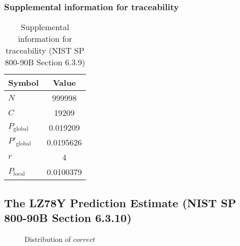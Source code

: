 \documentclass[a3paper,xelatex,english]{bxjsarticle}
\begin{document}
\subsubsection{Supplemental information for traceability}
\renewcommand{\arraystretch}{1.8}
\begin{table}[h]
\caption{Supplemental information for traceability (NIST SP 800-90B Section 6.3.9)}
\begin{center}
\begin{tabular}{|l|c|}
\hline 
\rowcolor{anotherlightblue} %
Symbol				& Value \\ \hline 
$N$				& 999998\\ \hline 
$C$				& 19209\\ \hline 
$P_{\textrm{global}}$				& 0.019209\\ \hline 
$P'_{\textrm{global}}$			& 0.0195626\\ \hline 
$r$				& 4\\ \hline 
$P_{\textrm{local}}$ 			& 0.0100379\\ \hline
\end{tabular}
\end{center}
\end{table}
\renewcommand{\arraystretch}{1.4}
\clearpage
\subsection{The LZ78Y Prediction Estimate (NIST SP 800-90B Section 6.3.10)}\label{sec:NonBinary6310}

\begin{figure}[htbp]
\centering

\caption{Distribution of $correct$}
\end{figure}
\end{document}
